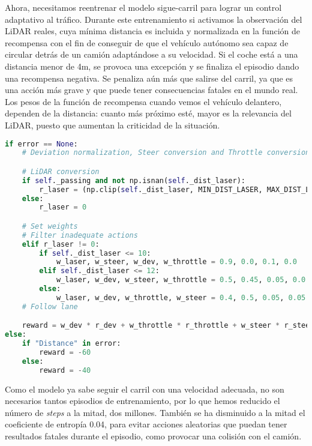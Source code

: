 Ahora, necesitamos reentrenar el modelo sigue-carril para lograr un control adaptativo al tráfico. Durante este entrenamiento si activamos la observación del \ac{LiDAR} reales, cuya mínima distancia es incluida y normalizada en la función de recompensa con el fin de conseguir de que el vehículo autónomo sea capaz de circular detrás de un camión adaptándose a su velocidad. Si el coche está a una distancia menor de 4m, se provoca una excepción y se finaliza el episodio dando una recompensa negativa. Se penaliza aún más que salirse del carril, ya que es una acción más grave y que puede tener consecuencias fatales en el mundo real. Los pesos de la función de recompensa cuando vemos el vehículo delantero, dependen de la distancia: cuanto más próximo esté, mayor es la relevancia del \ac{LiDAR}, puesto que aumentan la criticidad de la situación.

\begin{code}[H]
\begin{lstlisting}[language=Python]
if error == None:
    # Deviation normalization, Steer conversion and Throttle conversion

    # LiDAR conversion
    if self._passing and not np.isnan(self._dist_laser):
        r_laser = (np.clip(self._dist_laser, MIN_DIST_LASER, MAX_DIST_LASER) - MIN_DIST_LASER) / (MAX_DIST_LASER - MIN_DIST_LASER)       
    else:
        r_laser = 0

    # Set weights
    # Filter inadequate actions
    elif r_laser != 0:
        if self._dist_laser <= 10:
            w_laser, w_steer, w_dev, w_throttle = 0.9, 0.0, 0.1, 0.0
        elif self._dist_laser <= 12:
            w_laser, w_dev, w_steer, w_throttle = 0.5, 0.45, 0.05, 0.0
        else:
            w_laser, w_dev, w_throttle, w_steer = 0.4, 0.5, 0.05, 0.05
    # Follow lane

    reward = w_dev * r_dev + w_throttle * r_throttle + w_steer * r_steer + w_laser * r_laser
else:
    if "Distance" in error:
        reward = -60
    else:
        reward = -40
\end{lstlisting}
\caption[Función de recompensa respecto al \ac{LiDAR} para control adaptativo con \ac{PPO}]{Función de recompensa respecto al \ac{LiDAR} para control adaptativo con \ac{PPO}.}
\label{cod:rew_ppo_passing}
\end{code}

Como el modelo ya sabe seguir el carril con una velocidad adecuada, no son necesarios tantos episodios de entrenamiento, por lo que hemos reducido el número de \textit{steps} a la mitad, dos millones. También se ha disminuido a la mitad el coeficiente de entropía 0.04, para evitar acciones aleatorias que puedan tener resultados fatales durante el episodio, como provocar una colisión con el camión.

